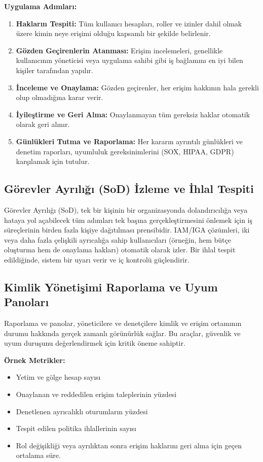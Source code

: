 \textbf{Uygulama Adımları:}
\begin{enumerate}
    \item \textbf{Hakların Tespiti:} Tüm kullanıcı hesapları, roller ve izinler dahil olmak üzere kimin neye erişimi olduğu kapsamlı bir şekilde belirlenir.
    \item \textbf{Gözden Geçirenlerin Atanması:} Erişim incelemeleri, genellikle kullanıcının yöneticisi veya uygulama sahibi gibi iş bağlamını en iyi bilen kişiler tarafından yapılır.
    \item \textbf{İnceleme ve Onaylama:} Gözden geçirenler, her erişim hakkının hala gerekli olup olmadığına karar verir.
    \item \textbf{İyileştirme ve Geri Alma:} Onaylanmayan tüm gereksiz haklar otomatik olarak geri alınır.
    \item \textbf{Günlükleri Tutma ve Raporlama:} Her kararın ayrıntılı günlükleri ve denetim raporları, uyumluluk gereksinimlerini (SOX, HIPAA, GDPR) karşılamak için tutulur.
\end{enumerate}

\subsection{Görevler Ayrılığı (SoD) İzleme ve İhlal Tespiti}

Görevler Ayrılığı (SoD), tek bir kişinin bir organizasyonda dolandırıcılığa veya hataya yol açabilecek tüm adımları tek başına gerçekleştirmesini önlemek için iş süreçlerinin birden fazla kişiye dağıtılması prensibidir. IAM/IGA çözümleri, iki veya daha fazla çelişkili ayrıcalığa sahip kullanıcıları (örneğin, hem bütçe oluşturma hem de onaylama hakları) otomatik olarak izler. Bir ihlal tespit edildiğinde, sistem bir uyarı verir ve iç kontrolü güçlendirir.

\subsection{Kimlik Yönetişimi Raporlama ve Uyum Panoları}

Raporlama ve panolar, yöneticilere ve denetçilere kimlik ve erişim ortamının durumu hakkında gerçek zamanlı görünürlük sağlar. Bu araçlar, güvenlik ve uyum duruşunu değerlendirmek için kritik öneme sahiptir.

\textbf{Örnek Metrikler:}
\begin{itemize}
    \item Yetim ve gölge hesap sayısı
    \item Onaylanan ve reddedilen erişim taleplerinin yüzdesi
    \item Denetlenen ayrıcalıklı oturumların yüzdesi
    \item Tespit edilen politika ihlallerinin sayısı
    \item Rol değişikliği veya ayrılıktan sonra erişim haklarını geri alma için geçen ortalama süre.
\end{itemize}
